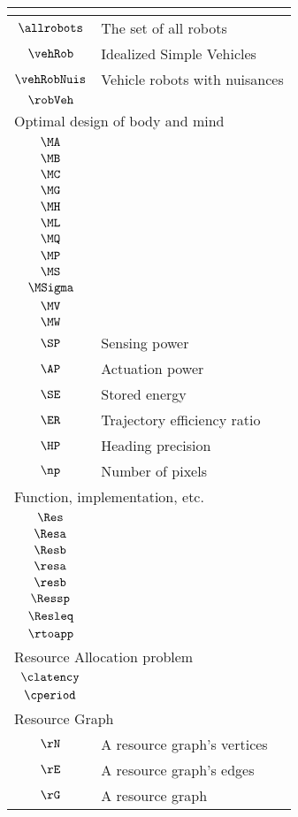\begin{longtable}{cl}
 \multicolumn{2}{l}{}\\ 
 \hline
$\allrobots$ &  The set of all robots\\ 
 $\vehRob$ &  Idealized Simple Vehicles\\ 
 $\vehRobNuis$ &  Vehicle robots with nuisances\\ 
 $\robVeh$ & \\ 
 \multicolumn{2}{l}{Optimal design of body and mind}\\ 
 \hline
$\MA$ & \\ 
 $\MB$ & \\ 
 $\MC$ & \\ 
 $\MG$ & \\ 
 $\MH$ & \\ 
 $\ML$ & \\ 
 $\MQ$ & \\ 
 $\MP$ & \\ 
 $\MS$ & \\ 
 $\MSigma$ & \\ 
 $\MV$ & \\ 
 $\MW$ & \\ 
 $\SP$ &  Sensing power\\ 
 $\AP$ &  Actuation power\\ 
 $\SE$ &  Stored energy\\ 
 $\ER$ &  Trajectory efficiency ratio\\ 
 $\HP$ &  Heading precision\\ 
 $\np$ &  Number of pixels\\ 
 \multicolumn{2}{l}{Function, implementation, etc.}\\ 
 \hline
$\Res$ & \\ 
 $\Resa$ & \\ 
 $\Resb$ & \\ 
 $\resa$ & \\ 
 $\resb$ & \\ 
 $\Ressp$ & \\ 
 $\Resleq$ & \\ 
 $\rtoapp$ & \\ 
 \multicolumn{2}{l}{Resource Allocation problem}\\ 
 \hline
$\clatency$ & \\ 
 $\cperiod$ & \\ 
 \multicolumn{2}{l}{Resource Graph}\\ 
 \hline
$\rN$ &  A resource graph's vertices\\ 
 $\rE$ &  A resource graph's edges\\ 
 $\rG$ &  A resource graph\\ 

\end{longtable}
